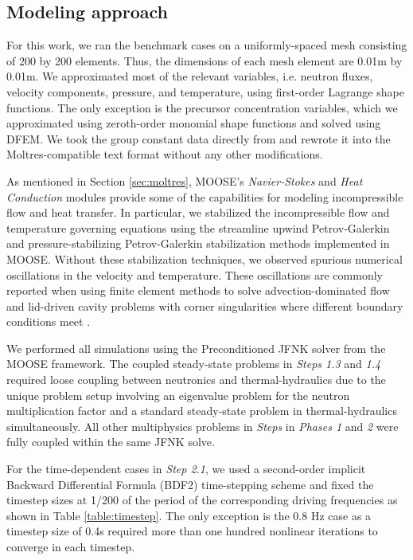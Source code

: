 \subsection{Modeling approach}


For this work, we ran the benchmark cases on a uniformly-spaced mesh consisting
of 200 by 200 elements. Thus, the dimensions of each mesh element are 0.01m by
0.01m. We
approximated most of the relevant variables, i.e. neutron fluxes, velocity
components, pressure, and temperature, using first-order Lagrange shape
functions. The only exception is the precursor concentration variables, which
we approximated using zeroth-order monomial shape functions and solved using
\gls{DFEM}. We took the group constant data directly from
\cite{tiberga_results_2020} and rewrote it into the Moltres-compatible text
format without any other modifications.

As mentioned in Section \ref{sec:moltres}, \gls{MOOSE}'s \textit{Navier-Stokes}
and \textit{Heat Conduction} modules provide some of the capabilities for
modeling incompressible flow and heat transfer. In particular, we stabilized
the incompressible flow and temperature governing equations using the
streamline upwind Petrov-Galerkin and pressure-stabilizing Petrov-Galerkin
stabilization methods \citep{peterson_overview_2017} implemented in
\gls{MOOSE}. Without these stabilization techniques, we observed spurious
numerical oscillations in the velocity and temperature. These oscillations are
commonly reported when using finite element methods to solve
advection-dominated flow and lid-driven cavity problems with corner
singularities where different boundary conditions meet
\citep{kuhlmann_lid-driven_2018}.

We performed all simulations using the Preconditioned \gls{JFNK} solver from
the \gls{MOOSE} framework. The coupled steady-state problems in
\textit{Steps 1.3} and \textit{1.4} required loose coupling between neutronics
and thermal-hydraulics due to the unique problem setup involving an eigenvalue
problem for the neutron multiplication factor and a standard steady-state
problem in thermal-hydraulics simultaneously. All other multiphysics problems
in \textit{Steps} in \textit{Phases 1} and \textit{2} were fully coupled
within the same \gls{JFNK} solve.

For the time-dependent cases in \textit{Step 2.1}, we used a second-order
implicit Backward Differential Formula (BDF2) time-stepping scheme and fixed
the timestep sizes at 1/200 of the period of the corresponding driving
frequencies as shown in Table \ref{table:timestep}. The only exception is the
0.8 Hz case as a timestep size of 0.4s required more than one hundred nonlinear
iterations to converge in each timestep.

